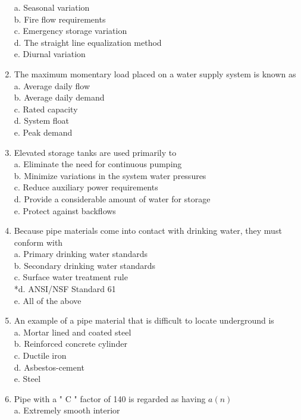 \begin{enumerate}[1.]
a. Seasonal variation\\
b. Fire flow requirements\\
c. Emergency storage variation\\
d. The straight line equalization method\\
e. Diurnal variation\\
\item The maximum momentary load placed on a water supply system is known as\\
a. Average daily flow\\
b. Average daily demand\\
c. Rated capacity\\
d. System float\\
e. Peak demand\\
\item Elevated storage tanks are used primarily to\\
a. Eliminate the need for continuous pumping\\
b. Minimize variations in the system water pressures\\
c. Reduce auxiliary power requirements\\
d. Provide a considerable amount of water for storage\\
e. Protect against backflows\\
\item Because pipe materials come into contact with drinking water, they must conform with\\
a. Primary drinking water standards\\
b. Secondary drinking water standards\\
c. Surface water treatment rule\\
*d. ANSI/NSF Standard 61\\
e. All of the above\\
\item An example of a pipe material that is difficult to locate underground is\\
a. Mortar lined and coated steel\\
b. Reinforced concrete cylinder\\
c. Ductile iron\\
d. Asbestos-cement\\
e. Steel\\
\item Pipe with a " C " factor of 140 is regarded as having $a(n)$\\
a. Extremely smooth interior\\

\end{enumerate}
